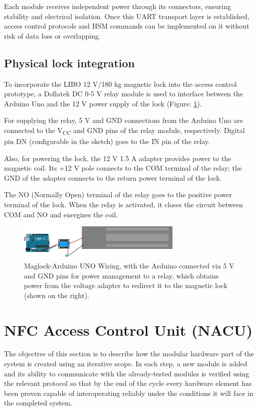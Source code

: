 Each module receives independent power through its connectors, ensuring stability and electrical isolation. Once this UART transport layer is established, access control protocols and HSM commands can be implemented on it without risk of data loss or overlapping.

\subsection{Physical lock integration}
\label{sec:NACU2}

To incorporate the LIBO 12 V/180 kg magnetic lock into the access control prototype, a Dollatek DC 0-5 V relay module is used to interface between the Arduino Uno and the 12 V power supply of the lock (Figure: \ref{fig:maglock_arduino}).

For supplying the relay, 5 V and GND connections from the Arduino Uno are connected to the V\textsubscript{CC} and GND pins of the relay module, respectively. Digital pin DN (configurable in the sketch) goes to the IN pin of the relay.

Also, for powering the lock, the 12 V 1.5 A adapter provides power to the magnetic coil. Its +12 V pole connects to the COM terminal of the relay; the GND of the adapter connects to the return power terminal of the lock.

The NO (Normally Open) terminal of the relay goes to the positive power terminal of the lock. When the relay is activated, it closes the circuit between COM and NO and energizes the coil.

\begin{figure}[H]
	\centering
	\includegraphics[width=0.7\textwidth]{imaxes/maglock.png}
	\caption{Maglock-Arduino UNO Wiring, with the Arduino connected via 5 V and GND pins for power management to a relay, which obtains power from the voltage adapter to redirect it to the magnetic lock (shown on the right).}
	\label{fig:maglock_arduino}
\end{figure}

\section{NFC Access Control Unit (NACU)}

The objective of this section is to describe how the modular hardware part of the system is created using an iterative scope. In each step, a new module is added and its ability to communicate with the already‑tested modules is verified using the relevant protocol so that by the end of the cycle every hardware element has been proven capable of interoperating reliably under the conditions it will face in the completed system.

